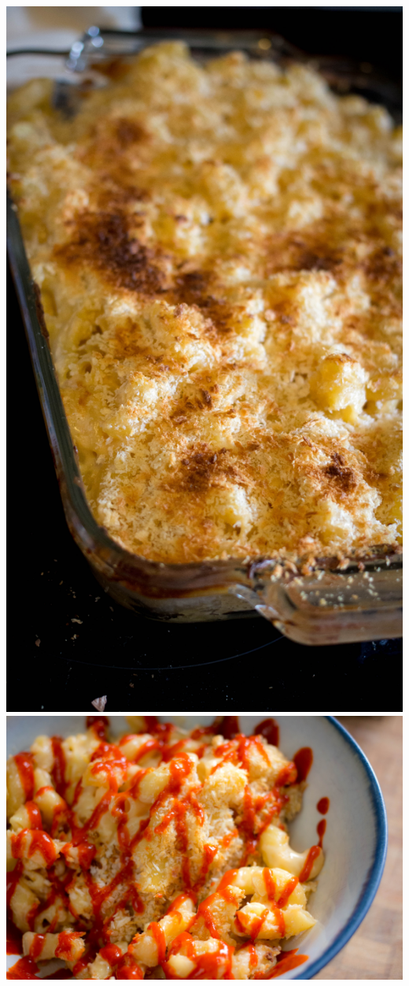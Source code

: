 \newpage
\includegraphics[height=\textheight]{food/mac-n-cheese/images/hi-res/15.jpg}
\newpage
\includegraphics[width=\textwidth]{food/mac-n-cheese/images/hi-res/16.jpg}
\newpage
